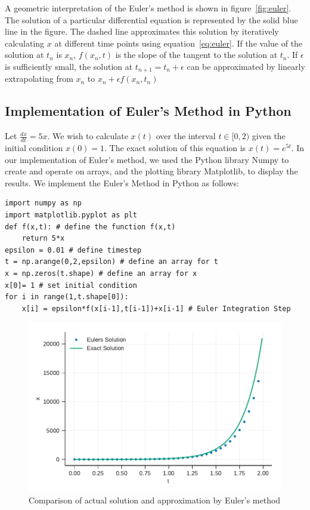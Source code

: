 \documentclass[10pt,letterpaper]{article}
\begin{document}
A geometric interpretation of the Euler's method is shown in figure~\ref{fig:euler}. The solution of a particular differential equation is represented by the solid blue line in the figure. The dashed line approximates this solution by iteratively calculating $x$ at different time points using equation~\ref{eq:euler}. If the value of the solution at $t_{n}$ is $x_{n}$, $f(x_{n},t)$ is the slope of the tangent to the solution at $t_{n}$. If $\epsilon$ is sufficiently small, the solution at $t_{n+1}=t_{n}+\epsilon$ can be approximated by linearly extrapolating from $x_{n}$ to $x_{n} + \epsilon f(x_{n},t_{n})$

\subsection*{Implementation of Euler's Method in Python}

Let $\frac{dx}{dt}=5x$. We wish to calculate $x(t)$ over the interval $t\in[0,2)$  given the initial condition $x(0)=1$. The exact solution of this equation is $x(t) = e^{5t}$. In our implementation of Euler's method, we used the Python library Numpy to create and operate on arrays, and the plotting library Matplotlib, to display the results. We implement the Euler's Method in Python as follows:

\begin{verbatim}
import numpy as np
import matplotlib.pyplot as plt
def f(x,t): # define the function f(x,t)
    return 5*x
epsilon = 0.01 # define timestep
t = np.arange(0,2,epsilon) # define an array for t
x = np.zeros(t.shape) # define an array for x
x[0]= 1 # set initial condition
for i in range(1,t.shape[0]):
    x[i] = epsilon*f(x[i-1],t[i-1])+x[i-1] # Euler Integration Step
\end{verbatim}

\begin{figure}[H]
\includegraphics[scale=0.7]{Figures/fig2.pdf} 
\caption{Comparison of actual solution and approximation by Euler's method}
\label{fig:eulerError}
\end{figure}
\end{document}
